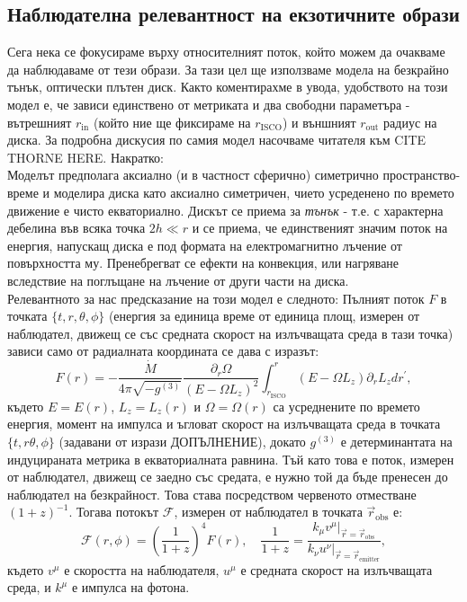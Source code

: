 \subsection{Наблюдателна релевантност на екзотичните образи}

Сега нека се фокусираме върху относителният поток, който можем да очакваме да наблюдаваме от тези образи. За тази цел ще използваме модела на безкрайно тънък, оптически плътен диск. Както коментирахме в увода, удобството на този модел е, че зависи единствено от метриката и два свободни параметъра - вътрешният $r_\text{in}$ (който ние ще фиксираме на $r_\text{ISCO}$) и външният $r_\text{out}$ радиус на диска. За подробна дискусия по самия модел насочваме читателя към CITE THORNE HERE. Накратко:\\

Моделът предполага аксиално (и в частност сферично) симетрично пространство-време и моделира диска като аксиално симетричен, чието усреденено по времето движение е чисто екваториално. Дискът се приема за \emph{тънък} - т.е. с характерна дебелина във всяка точка $2h \ll r$ и се приема, че единственият значим поток на енергия, напускащ диска е под формата на електромагнитно лъчение от повърхността му. Пренебрегват се ефекти на конвекция, или нагряване вследствие на поглъщане на лъчение от други части на диска.\\

Релевантното за нас предсказание на този модел е следното: Пълният поток $F$ в точката $\{t,r,\theta,\phi\}$ (енергия за единица време от единица площ, измерен от наблюдател, движещ се със средната скорост на излъчващата среда в тази точка) зависи само от радиалната координата се дава с изразът:
\begin{equation}
	F(r) = - \frac{\dot{M}}{4\pi\sqrt{-g^{(3)}}}\frac{\partial_r\Omega}{\left(E - \Omega L_z\right)^2}\int_{r_\text{ISCO}}^r \left(E - \Omega L_z\right)\partial_rL_zdr^\prime,
\end{equation}
където $E = E(r)$, $L_z = L_z(r)$ и $\Omega = \Omega(r)$ са усреднените по времето енергия, момент на импулса и ъгловат скорост на излъчващата среда в точката $\{t,r\theta,\phi\}$ (задавани от изрази ДОПЪЛНЕНИЕ), докато $g^{(3)}$ е детерминантата на индуцираната метрика в екваториалната равнина. Тъй като това е поток, измерен от наблюдател, движещ се заедно със средата, е нужно той да бъде пренесен до наблюдател на безкрайност. Това става посредством червеното отместване $(1 + z)^{-1}$. Тогава потокът $\mathcal{F}$, измерен от наблюдател в точката $\vec{r}_{\text{obs}}$ е:
\begin{equation}
	\mathcal{F}(r,\phi) = \left(\frac{1}{1+z} \right)^4 F(r),\quad \frac{1}{1 + z} = \frac{k_\mu v^\mu\vert_{\vec{r} = \vec{r}_\text{obs}}}{k_\nu u^\nu\vert_{\vec{r} = \vec{r}_\text{emitter}}},
\end{equation}
където $v^\mu$ е скоростта на наблюдателя, $u^\mu$ е средната скорост на излъчващата среда, и $k^\mu$ е импулса на фотона.\\

